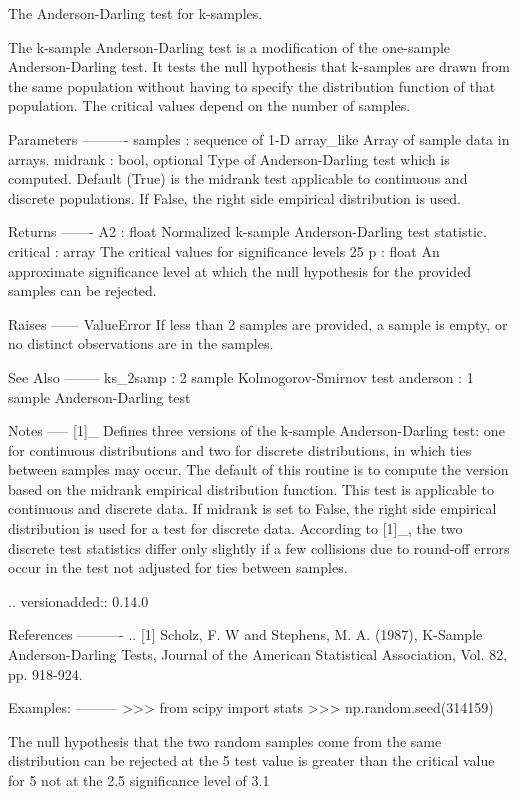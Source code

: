 \begin{DoxyVerb}The Anderson-Darling test for k-samples.

The k-sample Anderson-Darling test is a modification of the
one-sample Anderson-Darling test. It tests the null hypothesis
that k-samples are drawn from the same population without having
to specify the distribution function of that population. The
critical values depend on the number of samples.

Parameters
----------
samples : sequence of 1-D array_like
    Array of sample data in arrays.
midrank : bool, optional
    Type of Anderson-Darling test which is computed. Default
    (True) is the midrank test applicable to continuous and
    discrete populations. If False, the right side empirical
    distribution is used.

Returns
-------
A2 : float
    Normalized k-sample Anderson-Darling test statistic.
critical : array
    The critical values for significance levels 25%
p : float
    An approximate significance level at which the null hypothesis for the
    provided samples can be rejected.

Raises
------
ValueError
    If less than 2 samples are provided, a sample is empty, or no
    distinct observations are in the samples.

See Also
--------
ks_2samp : 2 sample Kolmogorov-Smirnov test
anderson : 1 sample Anderson-Darling test

Notes
-----
[1]_ Defines three versions of the k-sample Anderson-Darling test:
one for continuous distributions and two for discrete
distributions, in which ties between samples may occur. The
default of this routine is to compute the version based on the
midrank empirical distribution function. This test is applicable
to continuous and discrete data. If midrank is set to False, the
right side empirical distribution is used for a test for discrete
data. According to [1]_, the two discrete test statistics differ
only slightly if a few collisions due to round-off errors occur in
the test not adjusted for ties between samples.

.. versionadded:: 0.14.0

References
----------
.. [1] Scholz, F. W and Stephens, M. A. (1987), K-Sample
       Anderson-Darling Tests, Journal of the American Statistical
       Association, Vol. 82, pp. 918-924.

Examples:
---------
>>> from scipy import stats
>>> np.random.seed(314159)

The null hypothesis that the two random samples come from the same
distribution can be rejected at the 5%
test value is greater than the critical value for 5%
not at the 2.5%
significance level of 3.1%


\end{DoxyVerb}
